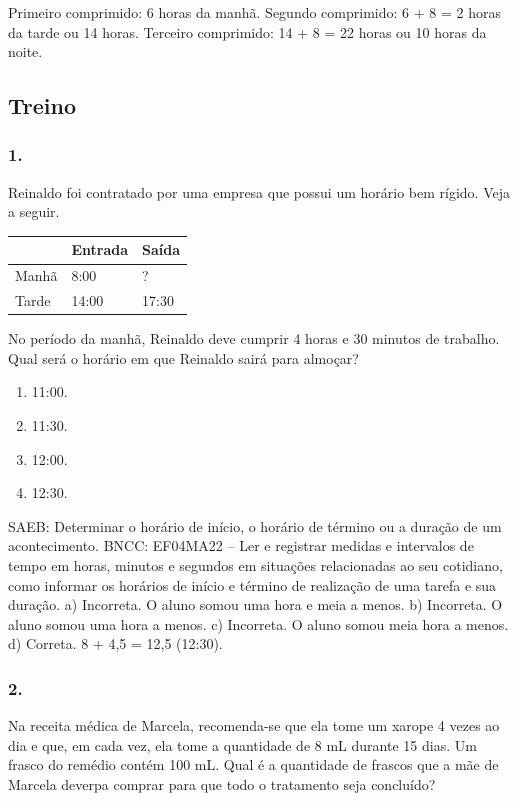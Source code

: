 \begin{enumerate}
\begin{escolha}
\begin{enumerate}
\begin{itemize}
\begin{itemize}
\begin{escolha}
Primeiro comprimido: 6 horas da manhã.
Segundo comprimido: 6 + 8 = 2 horas da tarde ou 14 horas.
Terceiro comprimido: 14 + 8 = 22 horas ou 10 horas da noite.

\subsection{Treino}\label{treino-3}

\subsubsection{1.}\label{section-49}

Reinaldo foi contratado por uma empresa que possui um horário bem rígido.
Veja a seguir.

\begin{longtable}[]{@{}lll@{}}
\toprule
& Entrada & Saída\tabularnewline
\midrule
\endhead
Manhã & 8:00 & ?\tabularnewline
Tarde & 14:00 & 17:30\tabularnewline
\bottomrule
\end{longtable}


No período da manhã, Reinaldo deve
cumprir 4 horas e 30 minutos de trabalho. Qual será o horário em que
Reinaldo sairá para almoçar?

\begin{enumerate}
\def\labelenumi{\alph{enumi})}
\item
  11:00.
\item
  11:30.
\item
  12:00.
\item
  12:30.
\end{enumerate}

SAEB: Determinar o horário de início, o horário de término ou a duração de um acontecimento.
BNCC: EF04MA22 -- Ler e registrar medidas e intervalos de tempo em horas, minutos e segundos em
situações relacionadas ao seu cotidiano, como informar os horários de início e término de realização
de uma tarefa e sua duração.
a) Incorreta. O aluno somou uma hora e meia a menos.
b) Incorreta. O aluno somou uma hora a menos.
c) Incorreta. O aluno somou meia hora a menos.
d) Correta. 8 + 4,5 = 12,5 (12:30).


\subsubsection{2.}\label{section-50}

Na receita médica de Marcela, recomenda-se que ela tome um xarope 4 vezes ao
dia e que, em cada vez, ela tome a quantidade de 8 mL durante 15 dias. Um
frasco do remédio contém 100 mL. Qual é a quantidade de
frascos que a mãe de Marcela deverpa comprar para que todo o tratamento
seja concluído?


\end{escolha}
\end{itemize}
\end{itemize}
\end{enumerate}
\end{escolha}
\end{enumerate}
